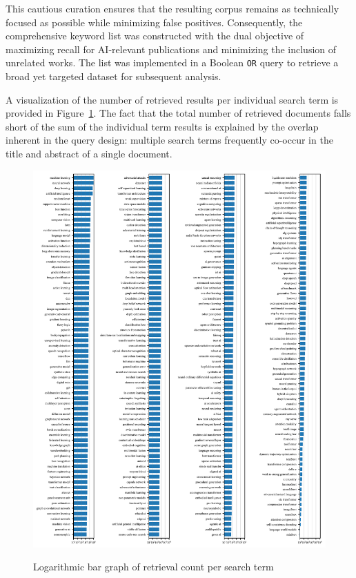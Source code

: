 \documentclass{article}
\begin{document}
This cautious curation ensures that the resulting corpus remains as technically focused as possible while minimizing false positives. Consequently, the comprehensive keyword list was constructed with the dual objective of maximizing recall for AI-relevant publications and minimizing the inclusion of unrelated works. The list was implemented in a Boolean \texttt{OR} query to retrieve a broad yet targeted dataset for subsequent analysis.

A visualization of the number of retrieved results per individual search term is provided in Figure~\ref{fig:log_bar_graph}. The fact that the total number of retrieved documents falls short of the sum of the individual term results is explained by the overlap inherent in the query design: multiple search terms frequently co-occur in the title and abstract of a single document.

\begin{figure}[!p]
	\centering
	\caption{Logarithmic bar graph of retrieval count per search term}
	\vspace{1em}
	\includegraphics[height=0.95\textheight, keepaspectratio]{logarithmic_bar_graph_seach_term_document_count.pdf}
	\label{fig:log_bar_graph}
\end{figure}
\end{document}
